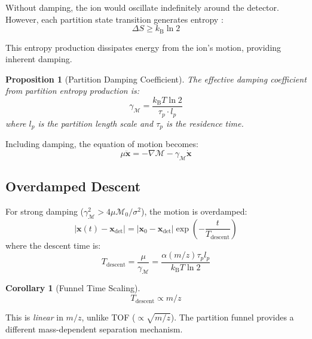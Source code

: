 \documentclass[twocolumn,10pt,a4paper]{article}
\newtheorem{proposition}[theorem]{Proposition}
\newtheorem{corollary}[theorem]{Corollary}
\theoremstyle{definition}
\theoremstyle{remark}
\newcommand{\kB}{k_{\mathrm{B}}}
\newcommand{\Mdepth}{\mathcal{M}}
\newcommand{\partinert}{\mu}
\newcommand{\taup}{\tau_p}
\newcommand{\xdet}{\mathbf{x}_{\mathrm{det}}}
\begin{document}
Without damping, the ion would oscillate indefinitely around the detector. However, each partition state transition generates entropy \citep{landauer1961}:
\begin{equation}
    \Delta S \geq \kB \ln 2
    \label{eq:landauer}
\end{equation}

This entropy production dissipates energy from the ion's motion, providing inherent damping.

\begin{proposition}[Partition Damping Coefficient]
\label{prop:damping}
The effective damping coefficient from partition entropy production is:
\begin{equation}
    \gamma_{\Mdepth} = \frac{\kB T \ln 2}{\taup \cdot l_p}
    \label{eq:damping_coeff}
\end{equation}
where $l_p$ is the partition length scale and $\taup$ is the residence time.
\end{proposition}

Including damping, the equation of motion becomes:
\begin{equation}
    \partinert\ddot{\mathbf{x}} = -\nabla\Mdepth - \gamma_{\Mdepth}\dot{\mathbf{x}}
    \label{eq:damped_eom}
\end{equation}

\subsection{Overdamped Descent}

For strong damping ($\gamma_{\Mdepth}^2 > 4\partinert\Mdepth_0/\sigma^2$), the motion is overdamped:
\begin{equation}
    |\mathbf{x}(t) - \xdet| = |\mathbf{x}_0 - \xdet|\exp\left(-\frac{t}{T_{\mathrm{descent}}}\right)
    \label{eq:overdamped}
\end{equation}
where the descent time is:
\begin{equation}
    T_{\mathrm{descent}} = \frac{\partinert}{\gamma_{\Mdepth}} = \frac{\alpha(m/z)\taup l_p}{\kB T \ln 2}
    \label{eq:descent_time}
\end{equation}

\begin{corollary}[Funnel Time Scaling]
\begin{equation}
    \boxed{T_{\mathrm{descent}} \propto m/z}
\end{equation}
\end{corollary}

This is \emph{linear} in $m/z$, unlike TOF ($\propto \sqrt{m/z}$). The partition funnel provides a different mass-dependent separation mechanism.
\end{document}

